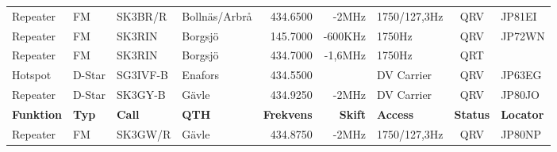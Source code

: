 \begin{landscape}
\begin{longtable}{llllrrlcl}
	Repeater          & FM           & SK3BR/R       & Bollnäs/Arbrå    &          434.6500 &          -2MHz & 1750/127,3Hz    &       QRV       & JP81EI           \\
	Repeater          & FM           & SK3RIN        & Borgsjö          &          145.7000 &        -600KHz & 1750Hz          &       QRV       & JP72WN           \\
	Repeater          & FM           & SK3RIN        & Borgsjö          &          434.7000 &        -1,6MHz & 1750Hz          &       QRT       &  \\
	Hotspot           & D-Star       & SG3IVF-B      & Enafors          &          434.5500 &                & DV Carrier      &       QRV       & JP63EG           \\
	Repeater          & D-Star       & SK3GY-B       & Gävle            &          434.9250 &          -2MHz & DV Carrier      &       QRV       & JP80JO           \\
\textbf{Funktion} & \textbf{Typ} & \textbf{Call} & \textbf{QTH}     & \textbf{Frekvens} & \textbf{Skift} & \textbf{Access} & \textbf{Status} & \textbf{Locator} \\ \hline
	Repeater          & FM           & SK3GW/R       & Gävle            &          434.8750 &          -2MHz & 1750/127,3Hz    &       QRV       & JP80NP           \\
		

\end{longtable}
\end{landscape}

